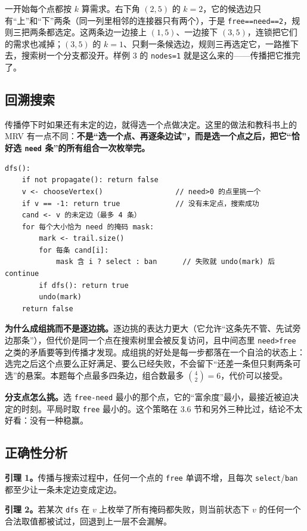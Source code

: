\documentclass[12pt,a4paper,fontset=windows]{ctexart}
\newcommand{\code}[1]{\texttt{#1}}
\begin{document}
一开始每个点都按 $k$ 算需求。右下角 $(2,5)$ 的 $k=2$，它的候选边只有“上”和“下”两条（同一列里相邻的连接器只有两个），于是 \code{free==need==2}，规则三把两条都选定。这两条边一边接上 $(1,5)$、一边接下 $(3,5)$，连锁把它们的需求也减掉；$(3,5)$ 的 $k=1$、只剩一条候选边，规则三再选定它，一路推下去，搜索树一个分支都没开。样例 3 的 \code{nodes=1} 就是这么来的——传播把它推完了。

\subsection{回溯搜索}

传播停下时如果还有未定的边，就得选一个点做决定。这里的做法和教科书上的 MRV 有一点不同：\textbf{不是“选一个点、再逐条边试”，而是选一个点之后，把它“恰好选 \code{need} 条”的所有组合一次枚举完。}

\begin{lstlisting}
dfs():
    if not propagate(): return false
    v <- chooseVertex()                 // need>0 的点里挑一个
    if v == -1: return true             // 没有未定点，搜索成功
    cand <- v 的未定边（最多 4 条）
    for 每个大小恰为 need 的掩码 mask:
        mark <- trail.size()
        for 每条 cand[i]:
            mask 含 i ? select : ban      // 失败就 undo(mark) 后 continue
        if dfs(): return true
        undo(mark)
    return false
\end{lstlisting}

\textbf{为什么成组挑而不是逐边挑。}逐边挑的表达力更大（它允许“这条先不管、先试旁边那条”），但代价是同一个点在搜索树里会被反复访问，且中间态里 \code{need>free} 之类的矛盾要等到传播才发现。成组挑的好处是每一步都落在一个自洽的状态上：选完之后这个点要么正好满足、要么已经失败，不会留下“还差一条但只剩两条可选”的悬案。本题每个点最多四条边，组合数最多 $\binom{4}{2}=6$，代价可以接受。

\textbf{分支点怎么挑。}选 \code{free-need} 最小的那个点，它的“富余度”最小，最接近被迫决定的时刻。平局时取 \code{free} 最小的。这个策略在 3.6 节和另外三种比过，结论不太好看：没有一种稳赢。

\subsection{正确性分析}

\textbf{引理 1。}传播与搜索过程中，任何一个点的 \code{free} 单调不增，且每次 \code{select}/\code{ban} 都至少让一条未定边变成定边。

\textbf{引理 2。}若某次 \code{dfs} 在 $v$ 上枚举了所有掩码都失败，则当前状态下 $v$ 的任何一个合法取值都被试过，回退到上一层不会漏解。
\end{document}
